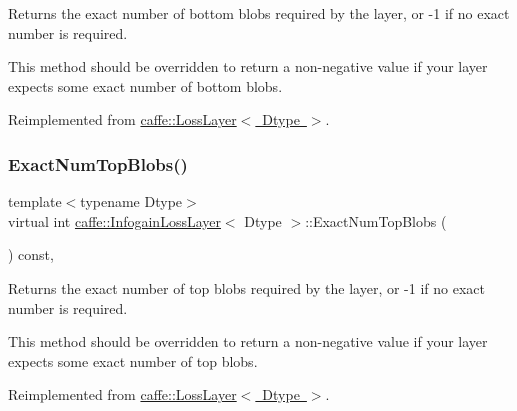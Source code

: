 Returns the exact number of bottom blobs required by the layer, or -\/1 if no exact number is required. 

This method should be overridden to return a non-\/negative value if your layer expects some exact number of bottom blobs. 

Reimplemented from \mbox{\hyperlink{classcaffe_1_1_loss_layer_af1620064baefb711e2c767bdc92b6fb1}{caffe\+::\+Loss\+Layer$<$ Dtype $>$}}.

\mbox{\label{classcaffe_1_1_infogain_loss_layer_aaf55e75f2296586b1fee0175e2d72fbb}} 
\subsubsection{\texorpdfstring{Exact\+Num\+Top\+Blobs()}{ExactNumTopBlobs()}\hspace{0.1cm}{\footnotesize\ttfamily [1/2]}}
{\footnotesize\ttfamily template$<$typename Dtype$>$ \\
virtual int \mbox{\hyperlink{classcaffe_1_1_infogain_loss_layer}{caffe\+::\+Infogain\+Loss\+Layer}}$<$ Dtype $>$\+::Exact\+Num\+Top\+Blobs (\begin{DoxyParamCaption}{ }\end{DoxyParamCaption}) const\hspace{0.3cm}{\ttfamily [inline]}, {\ttfamily [virtual]}}



Returns the exact number of top blobs required by the layer, or -\/1 if no exact number is required. 

This method should be overridden to return a non-\/negative value if your layer expects some exact number of top blobs. 

Reimplemented from \mbox{\hyperlink{classcaffe_1_1_loss_layer_aa5d5ab714a14082f5343dc9c49025b23}{caffe\+::\+Loss\+Layer$<$ Dtype $>$}}.

\mbox{\label{classcaffe_1_1_infogain_loss_layer_aaf55e75f2296586b1fee0175e2d72fbb}} 
